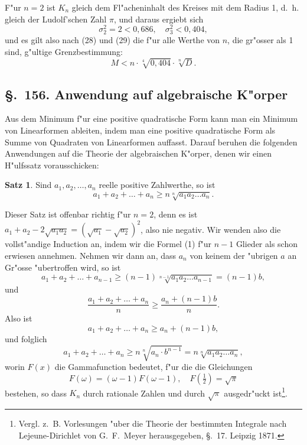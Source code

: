 \documentclass[12pt,a4paper]{article}
\theoremstyle{definition}
\newtheorem*{satz}{Satz}
\begin{document}
F"ur $n = 2$ ist $K_n$ gleich dem Fl"acheninhalt des Kreises mit dem Radius 1, d.~h. gleich der Ludolf'schen Zahl $\pi$, und daraus ergiebt sich
\begin{equation}
\sigma_2^2 = 2 < 0{,}686, \quad \sigma_3^2 < 0{,}404,
\end{equation}
und es gilt also nach (28) und (29) die f"ur alle Werthe von $n$, die gr"osser als 1 sind, g"ultige Grenzbestimmung:
\begin{equation}
M < n \cdot \sqrt[4]{0{,}404} \cdot \sqrt[n]{D}.
\end{equation}


\subsection*{\S.~156. Anwendung auf algebraische K"orper}

Aus dem Minimum f"ur eine positive quadratische Form kann man ein Minimum von Linearformen ableiten, indem man eine positive quadratische Form als Summe von Quadraten von Linearformen auffasst. Darauf beruhen die folgenden Anwendungen auf die Theorie der algebraischen K"orper, denen wir einen H"ulfssatz vorausschicken:

\begin{satz}
Sind $a_1, a_2, \dots, a_n$ reelle positive Zahlwerthe, so ist
\begin{equation}
a_1 + a_2 + \dots + a_n \geq n \sqrt[n]{a_1 a_2 \dots a_n}.
\end{equation}
\end{satz}

Dieser Satz ist offenbar richtig f"ur $n = 2$, denn es ist $a_1 + a_2 - 2\sqrt{a_1 a_2} = (\sqrt{a_1} - \sqrt{a_2})^2$, also nie negativ. Wir wenden also die vollst"andige Induction an, indem wir die Formel (1) f"ur $n-1$ Glieder als schon erwiesen annehmen. Nehmen wir dann an, dass $a_n$ von keinem der "ubrigen $a$ an Gr"osse "ubertroffen wird, so ist
\begin{equation}
a_1 + a_2 + \dots + a_{n-1} \geq (n-1) \sqrt[n-1]{a_1 a_2 \dots a_{n-1}} = (n-1)b,
\end{equation}
und
\begin{equation}
\frac{a_1 + a_2 + \dots + a_n}{n} \geq \frac{a_n + (n-1)b}{n}.
\end{equation}
Also ist
\begin{equation}
a_1 + a_2 + \dots + a_n \geq a_n + (n-1)b,
\end{equation}
und folglich
\begin{equation}
a_1 + a_2 + \dots + a_n \geq n \sqrt[n]{a_n \cdot b^{n-1}} = n \sqrt[n]{a_1 a_2 \dots a_n},
\end{equation}
worin $F(x)$ die Gammafunction bedeutet, f"ur die die Gleichungen
\begin{equation}
F(\omega) = (\omega-1)F(\omega-1), \quad F(\tfrac{1}{2}) = \sqrt{\pi}
\end{equation}
bestehen, so dass $K_n$ durch rationale Zahlen und durch $\sqrt{\pi}$ ausgedr"uckt ist\footnote{Vergl. z.~B. Vorlesungen "uber die Theorie der bestimmten Integrale nach Lejeune-Dirichlet von G.~F.~Meyer herausgegeben, \S.~17. Leipzig 1871.}.
\end{document}
